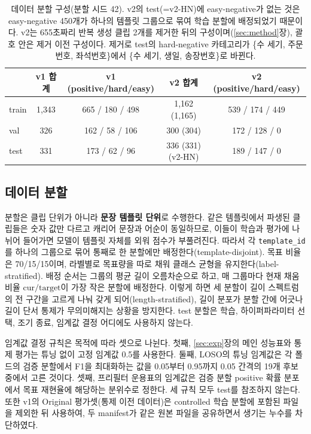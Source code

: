 \documentclass[11pt]{article}
\renewcommand{\emph}[1]{\textbf{#1}}
\begin{document}
\begin{table}[!htbp]
\centering
\caption{데이터 분할 구성(분할 시드 42). v2의 test(=v2-HN)에 easy-negative가 없는 것은
easy-negative 450개가 하나의 템플릿 그룹으로 묶여 학습 분할에 배정되었기 때문이다. v2는
655초짜리 반복 생성 클립 2개를 제거한 뒤의 구성이며(\ref{sec:method}장), 괄호 안은 제거
이전 구성이다. 제거로 test의 hard-negative 카테고리가 \{수 세기, 주문번호, 좌석번호\}에서
\{수 세기, 생일, 송장번호\}로 바뀐다.}
\label{tab:split}
\small
\begin{tabular}{lcccc}
\toprule
 & v1 합계 & v1 (positive/hard/easy) & v2 합계 & v2 (positive/hard/easy) \\
\midrule
train & 1{,}343 & 665 / 180 / 498 & 1{,}162 (1{,}165) & 539 / 174 / 449 \\
val   & 326     & 162 / 58 / 106  & 300 (304)         & 172 / 128 / 0   \\
test  & 331     & 173 / 62 / 96   & 336 (331) (v2-HN) & 189 / 147 / 0 \\
\bottomrule
\end{tabular}
\end{table}

\subsection{데이터 분할}\label{sec:method:split}
분할은 클립 단위가 아니라 \emph{문장 템플릿 단위}로 수행한다. 같은 템플릿에서 파생된
클립들은 숫자 값만 다르고 캐리어 문장과 어순이 동일하므로, 이들이 학습과 평가에 나뉘어
들어가면 모델이 템플릿 자체를 외워 점수가 부풀려진다. 따라서 각 \texttt{template\_id}를
하나의 그룹으로 묶어 통째로 한 분할에만 배정한다(template-disjoint). 목표 비율은
70/15/15이며, 라벨별로 목표량을 따로 채워 클래스 균형을 유지한다(label-stratified).
배정 순서는 그룹의 평균 길이 오름차순으로 하고, 매 그룹마다 현재 채움 비율
$\mathrm{cur}/\mathrm{target}$이 가장 작은 분할에 배정한다. 이렇게 하면 세 분할이 길이
스펙트럼의 전 구간을 고르게 나눠 갖게 되어(length-stratified), 길이 분포가 분할 간에
어긋나 길이 단서 통제가 무의미해지는 상황을 방지한다. test 분할은 학습, 하이퍼파라미터
선택, 조기 종료, 임계값 결정 어디에도 사용하지 않는다.

임계값 결정 규칙은 목적에 따라 셋으로 나뉜다. 첫째, \ref{sec:exp}장의 메인 성능표와 통제
평가는 튜닝 없이 고정 임계값 0.5를 사용한다. 둘째, LOSO의 튜닝 임계값은 각 폴드의 검증
분할에서 F1을 최대화하는 값을 0.05부터 0.95까지 0.05 간격의 19개 후보 중에서 고른 것이다.
셋째, 프리필터 운용표의 임계값은 검증 분할 positive 확률 분포에서 목표 재현율에 해당하는
분위수로 정한다. 세 규칙 모두 test를 참조하지 않는다. 또한 v1의 Original 평가셋(통제 이전
데이터)은 controlled 학습 분할에 포함된 파일을 제외한 뒤 사용하여, 두 manifest가 같은 원본
파일을 공유하면서 생기는 누수를 차단하였다.
\end{document}
